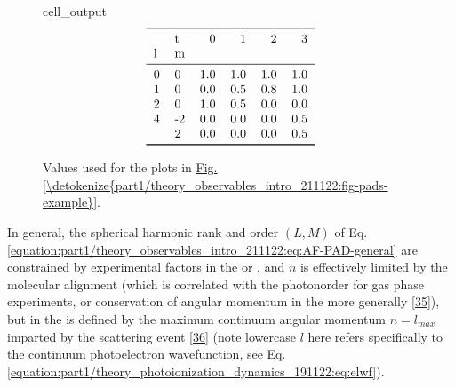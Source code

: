 \documentclass[letterpaper,table,10pt,english]{jupyterBook}
\begin{document}
\begin{figure}[htbp]
\centering
\capstart
\begin{sphinxVerbatimOutput}

\begin{sphinxuseclass}{cell_output}\begin{equation*}
\begin{split}\begin{tabular}{llrrrr}
\toprule
  & t &    0 &    1 &    2 &    3 \\
l & m &      &      &      &      \\
\midrule
0 &  0 &  1.0 &  1.0 &  1.0 &  1.0 \\
1 &  0 &  0.0 &  0.5 &  0.8 &  1.0 \\
2 &  0 &  1.0 &  0.5 &  0.0 &  0.0 \\
4 & -2 &  0.0 &  0.0 &  0.0 &  0.5 \\
  &  2 &  0.0 &  0.0 &  0.0 &  0.5 \\
\bottomrule
\end{tabular}\end{split}
\end{equation*}
\end{sphinxuseclass}\end{sphinxVerbatimOutput}
\caption{Values used for the plots in \hyperref[\detokenize{part1/theory_observables_intro_211122:fig-pads-example}]{Fig.\@ \ref{\detokenize{part1/theory_observables_intro_211122:fig-pads-example}}}.}\label{\detokenize{part1/theory_observables_intro_211122:blm-tab}}\end{figure}

\sphinxAtStartPar
In general, the spherical harmonic rank and order \((L,M)\) of Eq. \eqref{equation:part1/theory_observables_intro_211122:eq:AF-PAD-general} are constrained by experimental factors in the {\hyperref[\detokenize{backmatter/glossary:term-LF}]{}} or {\hyperref[\detokenize{backmatter/glossary:term-AF}]{}}, and \(n\) is effectively limited by the molecular alignment (which is correlated with the photon\sphinxhyphen{}order for gas phase experiments, or conservation of angular momentum in the {\hyperref[\detokenize{backmatter/glossary:term-LF}]{}} more generally {[}\hyperlink{cite.backmatter/bibliography:id814}{35}{]}), but in the {\hyperref[\detokenize{backmatter/glossary:term-MF}]{}} is defined by the maximum continuum angular momentum \(n=l_{max}\) imparted by the scattering event {[}\hyperlink{cite.backmatter/bibliography:id485}{36}{]} (note lower\sphinxhyphen{}case \(l\) here refers specifically to the continuum photoelectron wavefunction, see Eq. \eqref{equation:part1/theory_photoionization_dynamics_191122:eq:elwf}).
\end{document}
